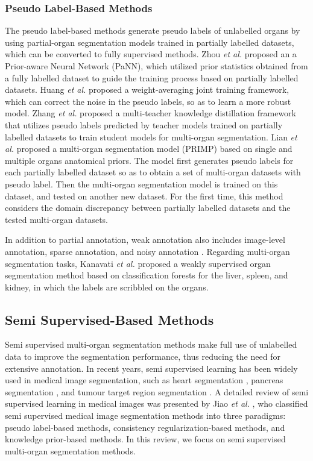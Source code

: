 \documentclass[lettersize,journal]{IEEEtran}
\begin{document}
\subsubsection{Pseudo Label-Based Methods}
The pseudo label-based methods generate pseudo labels of unlabelled organs by using partial-organ segmentation models trained in partially labelled datasets, which can be converted to fully supervised methods. Zhou {\it{et al.}} \cite{161} proposed an a Prior-aware Neural Network (PaNN), which utilized prior statistics obtained from a fully labelled dataset to guide the training process based on partially labelled datasets. Huang {\it{et al.}} \cite{197} proposed a weight-averaging joint training framework, which can correct the noise in the pseudo labels, so as to learn a more robust model. Zhang {\it{et al.}} \cite{198} proposed a multi-teacher knowledge distillation framework that utilizes pseudo labels predicted by teacher models trained on partially labelled datasets to train student models for multi-organ segmentation. Lian {\it{et al.}} \cite{162} proposed a multi-organ segmentation model (PRIMP) based on single and multiple organs anatomical priors. The model first generates pseudo labels for each partially labelled dataset so as to obtain a set of multi-organ datasets with pseudo label. Then the multi-organ segmentation model is trained on this dataset, and tested on another new dataset. For the first time, this method considers the domain discrepancy between partially labelled datasets and the tested multi-organ datasets.

In addition to partial annotation, weak annotation also includes image-level annotation, sparse annotation, and noisy annotation \cite{199}. Regarding multi-organ segmentation tasks, Kanavati {\it{et al.}} \cite{200} proposed a weakly supervised organ segmentation method based on classification forests for the liver, spleen, and kidney, in which the labels are scribbled on the organs.

\subsection{Semi Supervised-Based Methods}
\label{sec5_2}
Semi supervised multi-organ segmentation methods make full use of unlabelled data to improve the segmentation performance, thus reducing the need for extensive annotation. In recent years, semi supervised learning has been widely used in medical image segmentation, such as heart segmentation \cite{201,202,203}, pancreas segmentation \cite{204}, and tumour target region segmentation \cite{205}. A detailed review of semi supervised learning in medical images was presented by Jiao {\it{et al.}} \cite{206}, who classified semi supervised medical image segmentation methods into three paradigms: pseudo label-based methods, consistency regularization-based methods, and knowledge prior-based methods. In this review, we focus on semi supervised multi-organ segmentation methods.
\end{document}
